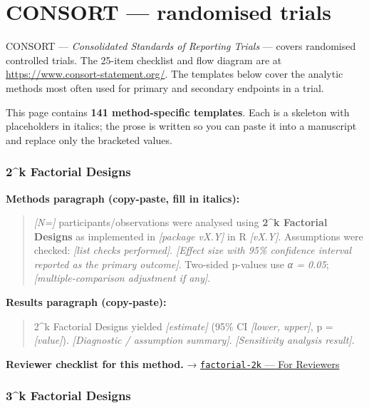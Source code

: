 \documentclass[
]{article}
\author{}
\date{\vspace{-2.5em}}
\begin{document}
\section{CONSORT --- randomised trials}\label{consort-randomised-trials}

CONSORT --- \emph{Consolidated Standards of Reporting Trials} --- covers
randomised controlled trials. The 25-item checklist and flow diagram are
at \url{https://www.consort-statement.org/}. The templates below cover
the analytic methods most often used for primary and secondary endpoints
in a trial.

This page contains \textbf{141 method-specific templates}. Each is a
skeleton with placeholders in italics; the prose is written so you can
paste it into a manuscript and replace only the bracketed values.

\subsubsection{2\^{}k Factorial Designs}\label{k-factorial-designs}

\textbf{Methods paragraph (copy-paste, fill in italics):}

\begin{quote}
\emph{{[}N={]}} participants/observations were analysed using
\textbf{2\^{}k Factorial Designs} as implemented in \emph{{[}package
vX.Y{]}} in R \emph{{[}vX.Y{]}}. Assumptions were checked: \emph{{[}list
checks performed{]}}. \emph{{[}Effect size with 95\% confidence interval
reported as the primary outcome{]}}. Two-sided p-values use \emph{α =
0.05}; \emph{{[}multiple-comparison adjustment if any{]}}.
\end{quote}

\textbf{Results paragraph (copy-paste):}

\begin{quote}
2\^{}k Factorial Designs yielded \emph{{[}estimate{]}} (95\% CI
\emph{{[}lower, upper{]}}, p = \emph{{[}value{]}}). \emph{{[}Diagnostic
/ assumption summary{]}}. \emph{{[}Sensitivity analysis result{]}}.
\end{quote}

\textbf{Reviewer checklist for this method.} →
\href{../chapters/16-design/factorial-2k.Rmd\#for-reviewers}{\texttt{factorial-2k}
--- For Reviewers}

\subsubsection{3\^{}k Factorial Designs}\label{k-factorial-designs-1}
\end{document}
